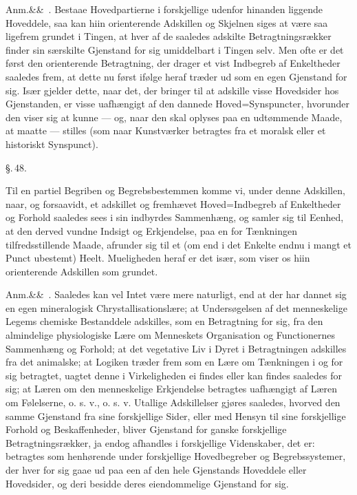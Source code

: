 \documentclass[12pt]{book}
\def\sperr#1{#1}%
\def\textit#1{#1}%
\newcommand{\sperr}[1]{\textls[180]{#1}}
\newcommand{\parag}[1]{%
  \par\vspace{0.9\baselineskip}%
  {\centering\textit{\S.\,#1.}\par}%
  \vspace{0.35\baselineskip}%
  \noindent\hspace{\parindent}\ignorespaces
}
\newcommand{\anm}[1]{%
  \par\vspace{0.5\baselineskip}%
  \noindent\hspace{\parindent}\sperr{Anm.}\ifx&#1&\else~\textit{#1}.\fi
  \enspace\ignorespaces
}
\newcommand{\opage}[1]{\marginnote{\footnotesize\textit{[#1]}}}
\begin{document}
\anm{} Bestaae Hovedpartierne i forskjellige udenfor hinanden liggende
Hoveddele, saa kan hiin orienterende Adskillen og Skjelnen siges at være saa
ligefrem grundet i Tingen, at hver af de saaledes adskilte Betragtningsrækker
finder sin særskilte Gjenstand for sig umiddelbart i Tingen selv. Men ofte er
det først den orienterende Betragtning, der drager et vist Indbegreb af
Enkeltheder saaledes frem, at dette nu først ifølge heraf træder ud som en egen
Gjenstand for sig. Især gjelder dette, naar det, der bringer til at adskille
\opage{113} visse Hovedsider hos Gjenstanden, er visse uafhængigt af den dannede
Hoved=Synspuncter, hvorunder den viser sig at kunne --- og, naar den skal
oplyses paa en udtømmende Maade, at maatte --- stilles (som naar Kunstværker
betragtes fra et moralsk eller et historiskt Synspunct).

\parag{48}

Til en partiel Begriben og Begrebsbestemmen komme vi, under denne Adskillen,
naar, og forsaavidt, et adskillet og fremhævet Hoved=Indbegreb af Enkeltheder og
Forhold saaledes sees i sin indbyrdes Sammenhæng, og samler sig til Eenhed, at
den derved vundne Indsigt og Erkjendelse, paa en for Tænkningen
tilfredsstillende Maade, afrunder sig til et (om end i det Enkelte endnu i mangt
et Punct ubestemt) Heelt. Mueligheden heraf er det især, som viser os hiin
orienterende Adskillen som grundet.

\anm{} Saaledes kan vel Intet være mere naturligt, end at der har dannet sig en
egen mineralogisk Chrystallisationslære; at Undersøgelsen af det menneskelige
Legems chemiske Bestanddele adskilles, som en Betragtning for sig, fra den
almindelige physiologiske Lære om Menneskets Organisation og Functionernes
Sammenhæng og Forhold; at det vegetative Liv i Dyret i Betragtningen adskilles
fra det animalske; at Logiken træder frem som en Lære om Tænkningen i og for sig
betragtet, uagtet denne i Virkeligheden ei findes eller kan findes saaledes for
sig; at Læren om den menneskelige Erkjendelse betragtes
\opage{114} uafhængigt af Læren om Følelserne, o. s. v., o. s. v. Utallige Adskillelser
gjøres saaledes, hvorved den samme Gjenstand fra sine forskjellige Sider, eller
med Hensyn til sine forskjellige Forhold og Beskaffenheder, bliver Gjenstand for
ganske forskjellige Betragtningsrækker, ja endog afhandles i forskjellige
Videnskaber, det er: betragtes som henhørende under forskjellige Hovedbegreber
og Begrebssystemer, der hver for sig gaae ud paa een af den hele Gjenstands
Hoveddele eller Hovedsider, og deri besidde deres eiendommelige Gjenstand for
sig.
\end{document}
